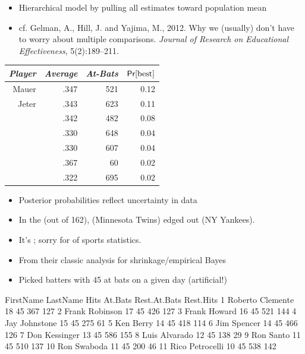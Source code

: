 \documentclass[10pt]{report}
\begin{document}
%
\begin{itemize}
\item Hierarchical model  by pulling
  all estimates toward population mean
\item \small cf. Gelman, A., Hill, J. and Yajima, M., 2012. Why we (usually) don't have to worry about multiple comparisons. {\slshape Journal of Research on Educational Effectiveness}, 5(2):189--211.
\end{itemize}


%
\begin{center}
{\small
\begin{tabular}{rrrr}
\emph{Player} & \emph{Average} & \emph{At-Bats} & $\text{\sf Pr}[\text{best}]$
\\ \hline
Mauer & .347 & 521 & 0.12
\\
Jeter & .343 & 623 & 0.11
\\
& .342 & 482 & 0.08
\\
& .330 & 648 & 0.04
\\
& .330 & 607 & 0.04
\\
& .367 & 60 & 0.02
\\
& .322 & 695 & 0.02
\end{tabular}
}
\end{center}
\begin{itemize}
\item Posterior probabilities reflect uncertainty in data
\item In the  (out of 162),  (Minnesota Twins) edged out  (NY Yankees).
\vfill
\item It's ; sorry for  of sports statistics.
\end{itemize}


%
\begin{itemize}
\item From their classic analysis for shrinkage/empirical Bayes
\item Picked batters with 45 at bats on a given day (artificial!)
\end{itemize}
\begin{stancode}
   FirstName   LastName Hits At.Bats Rest.At.Bats Rest.Hits
1    Roberto   Clemente   18      45          367       127
2      Frank   Robinson   17      45          426       127
3      Frank     Howard   16      45          521       144
4        Jay  Johnstone   15      45          275        61
5        Ken      Berry   14      45          418       114
6        Jim    Spencer   14      45          466       126
7        Don  Kessinger   13      45          586       155
8       Luis   Alvarado   12      45          138        29
9        Ron      Santo   11      45          510       137
10       Ron    Swaboda   11      45          200        46
11      Rico Petrocelli   10      45          538       142
\end{stancode}
\end{document}
